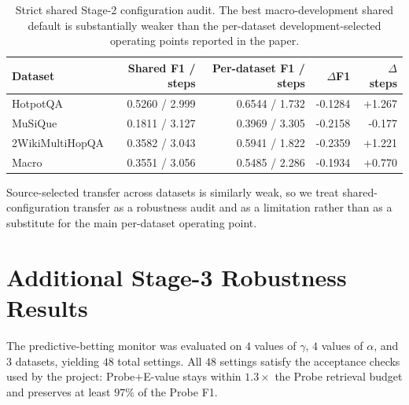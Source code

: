 \documentclass{article}
\newcommand{\hotpot}{HotpotQA}
\newcommand{\musique}{MuSiQue}
\newcommand{\twowiki}{2WikiMultiHopQA}
\begin{document}
\begin{table}[htbp]
  \caption{Strict shared Stage-2 configuration audit. The best macro-development shared default is substantially weaker than the per-dataset development-selected operating points reported in the paper.}
  \label{tab:appendix-shared-default}
  \centering
  \small
  \begin{tabular}{lrrrr}
    \toprule
    Dataset & Shared F1 / steps & Per-dataset F1 / steps & $\Delta$F1 & $\Delta$steps \\
    \midrule
    \hotpot{} & 0.5260 / 2.999 & 0.6544 / 1.732 & -0.1284 & +1.267 \\
    \musique{} & 0.1811 / 3.127 & 0.3969 / 3.305 & -0.2158 & -0.177 \\
    \twowiki{} & 0.3582 / 3.043 & 0.5941 / 1.822 & -0.2359 & +1.221 \\
    Macro & 0.3551 / 3.056 & 0.5485 / 2.286 & -0.1934 & +0.770 \\
    \bottomrule
  \end{tabular}
\end{table}

Source-selected transfer across datasets is similarly weak, so we treat shared-configuration transfer as a robustness audit and as a limitation rather than as a substitute for the main per-dataset operating point.

\section{Additional Stage-3 Robustness Results}
\label{app:stage3}

The predictive-betting monitor was evaluated on $4$ values of $\gamma$, $4$ values of $\alpha$, and $3$ datasets, yielding $48$ total settings. All $48$ settings satisfy the acceptance checks used by the project: Probe+E-value stays within $1.3\times$ the Probe retrieval budget and preserves at least $97\%$ of the Probe F1.
\end{document}
